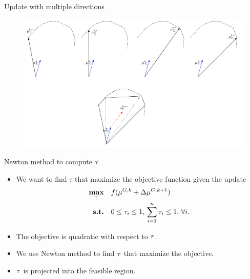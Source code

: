 \documentclass[first=dgreen,second=purple,logo=yellowexc]{aaltoslides}
\begin{document}
\begin{frame}{Update with multiple directions}
	\begin{figure}
		\begin{center}
			\includegraphics[scale=0.3]{multiple_update.pdf}
		\end{center}
	\end{figure}
\end{frame}

\begin{frame}{Newton method to compute $\mathbf {\tau}$}
	\begin{itemize}\footnotesize
		\item We want to find $\tau$ that maximize the objective function given the update
		\begin{align*}
			\underset{\tau}{\textbf{max}} & \quad f(\mathbf {\mu}^{G,k} + \Delta{\mathbf {\mu}}^{G,k+1})\\
			\textbf{s.t.} & \quad 0\le\tau_i\le1,\,\sum_{i=1}^n\tau_i\le1,\,\forall i.
		\end{align*}
		\item The objective is quadratic with respect to $\mathbf {\tau}$.
		\item We use Newton method to find $\mathbf {\tau}$ that maximize the objective.
		\item $\mathbf {\tau}$ is projected into the feasible region.
	\end{itemize}
\end{frame}
\fi
\end{document}
